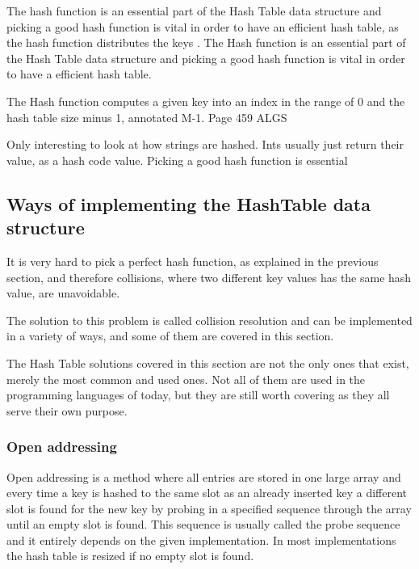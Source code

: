 \documentclass[titlepage]{article}
\begin{document}
	
	  
	
	The hash function is an essential part of the Hash Table data structure and picking a good hash function is vital in order to have an efficient hash table, as the hash function distributes the keys 
	.  
	The Hash function is an essential part of the Hash Table data structure and picking a good hash function is vital in order to have a efficient hash table.      
	
	
	
	The Hash function computes a given key into an index in the range of 0 and the hash table size minus 1, annotated M-1. Page 459 ALGS
	
		
	
	Only interesting to look at how strings are hashed. Ints usually just return their value, as a hash code value. 
	Picking a good hash function is essential
	
	\subsection{Ways of implementing the HashTable data structure }
	It is very hard to pick a perfect hash function, as explained in the previous section, and therefore collisions, where two different key values has the same hash value, are unavoidable. 
	
	The solution to this problem is called collision resolution and can be implemented in a variety of ways, and some of them are covered in this section. 
	
	The Hash Table solutions covered in this section are not the only ones that exist, merely the most common and used ones. Not all of them are used in the programming languages of today, but they are still worth covering as they all serve their own purpose. 
	
	
	
	\subsubsection{Open addressing} %
	Open addressing is a method where all entries are stored in one large array and every time a key is hashed to the same slot as an already inserted key a different slot is found for the new key by probing in a specified sequence through the array until an empty slot is found. This sequence is usually called the probe sequence and it entirely depends on the given implementation.
	In most implementations the hash table is resized if no empty slot is found.  
	
\end{document}
